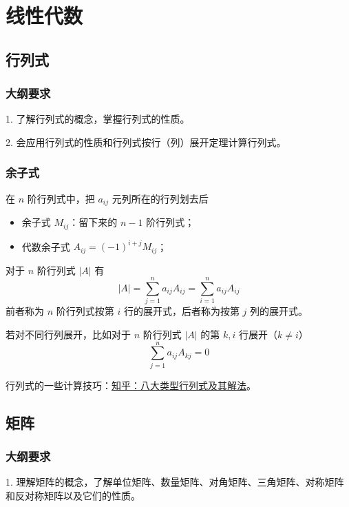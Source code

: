 \chapter{线性代数}

\newcommand{\transpose}[1]{{#1}^\mathsf{T}}

\section{行列式}

\subsection{大纲要求}

1. 了解行列式的概念，掌握行列式的性质。

2. 会应用行列式的性质和行列式按行（列）展开定理计算行列式。

\subsection{余子式}

在 $n$ 阶行列式中，把 $a_{ij}$ 元列所在的行列划去后
\begin{itemize}
	\item 余子式 $M_{ij}$：留下来的 $n-1$ 阶行列式；
	\item 代数余子式 $A_{ij} = (-1)^{i+j} M_{ij}$；
\end{itemize}

\begin{theorem}
	对于 $n$ 阶行列式 $|A|$ 有
	\[|A| = \sum_{j=1}^na_{ij}A_{ij} = \sum_{i=1}^na_{ij}A_{ij}\]
	前者称为 $n$ 阶行列式按第 $i$ 行的展开式，后者称为按第 $j$ 列的展开式。
\end{theorem}

若对不同行列展开，比如对于 $n$ 阶行列式 $|A|$ 的第 $k, i$ 行展开（$k \neq i$）
\[\sum_{j=1}^na_{ij}A_{kj} = 0 \]

行列式的一些计算技巧：\href{https://zhuanlan.zhihu.com/p/34685081}{知乎：八大类型行列式及其解法}。

\section{矩阵}

\subsection{大纲要求}

1. 理解矩阵的概念，了解单位矩阵、数量矩阵、对角矩阵、三角矩阵、对称矩阵和反对称矩阵以及它们的性质。

